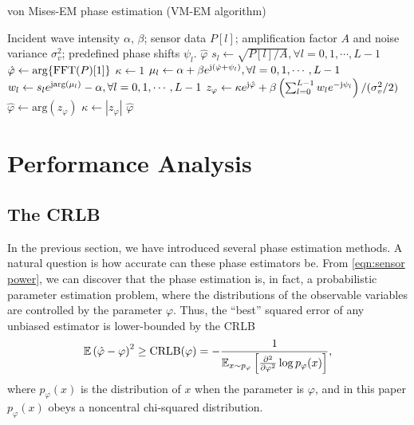 \documentclass[12pt,draftclsnofoot,journal,onecolumn]{IEEEtran}
\theoremstyle{nonumberplain}
\def \arg {\text{arg}}
\begin{document}
    \begin{algorithm}[htbp] 
        \caption{von Mises-EM phase estimation (VM-EM algorithm)} \label{alg:VM-EM}
        \begin{algorithmic}[1]
            \REQUIRE Incident wave intensity $\alpha$, $\beta$; sensor data $P[l]$; amplification factor $A$ and noise variance $\sigma_v^2$; predefined phase shifts $\psi_l$.
            \ENSURE $\hat{\varphi}$
            \STATE $s_l \leftarrow \sqrt{P[l]/A}, \forall l=0,1,\cdots,L-1$
            \STATE $\hat{\varphi} \leftarrow \arg\{{\rm FFT}(P)[1]\}$
            \STATE $\kappa \leftarrow 1$
                \STATE $\mu_l \leftarrow \alpha + \beta e^{{\rm j} (\hat{\varphi}+\psi_l)}, \forall l=0,1,\cdots,L-1$
                \STATE $w_l \leftarrow s_l e^{{\rm j} \arg(\mu_l)} - \alpha, \forall l=0,1,\cdots,L-1$
                \STATE $z_\varphi \leftarrow \kappa e^{{\rm j} \hat{\varphi}} + \beta \left( \sum_{l=0}^{L-1}{w_l e^{-{\rm j} \psi_l}}\right) / (\sigma_v^2/2)$
                \STATE $\hat{\varphi} \leftarrow \arg(z_\varphi)$
                \STATE $\kappa \leftarrow |z_\varphi|$
            \ENDWHILE
            \RETURN $\hat{\varphi}$
        \end{algorithmic}
    \end{algorithm}
    
\section{Performance Analysis}
\label{Performance Analysis}
\subsection{The CRLB}
    In the previous section, we have introduced several phase estimation methods. A natural question is how accurate can these phase estimators be. From \eqref{eqn:sensor power}, we can discover that the phase estimation is, in fact, a probabilistic parameter estimation problem, where the distributions of the observable variables are controlled by the parameter $\varphi$. Thus, the ``best'' squared error of any unbiased estimator is lower-bounded by the CRLB \cite{casella2021statistical} 
    \begin{equation}
        \mathbb{E}\left(\hat{\varphi}-\varphi\right)^2 \geq {\rm CRLB}(\varphi) = -\frac{1}{\mathbb{E}_{x\sim p_\varphi}\left[\frac{\partial^2}{\partial\varphi^2}\log p_{\varphi}(x)\right]},
        \label{eqn:CRLB definition}
    \end{equation}
    where $p_{\varphi}(x)$ is the distribution of $x$ when the parameter is $\varphi$, and in this paper $p_{\varphi}(x)$ obeys a noncentral chi-squared distribution. 
\end{document}
